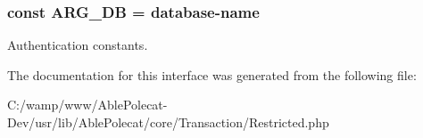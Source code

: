 \subsubsection[{A\+R\+G\+\_\+\+D\+B}]{\setlength{\rightskip}{0pt plus 5cm}const A\+R\+G\+\_\+\+D\+B = \textquotesingle{}database-\/name\textquotesingle{}}\label{interface_able_polecat___transaction___restricted_interface_a10cda78d935c26575ec9618b61e0aef5}
Authentication constants. 

The documentation for this interface was generated from the following file\+:\begin{DoxyCompactItemize}
\item 
C\+:/wamp/www/\+Able\+Polecat-\/\+Dev/usr/lib/\+Able\+Polecat/core/\+Transaction/Restricted.\+php\end{DoxyCompactItemize}

